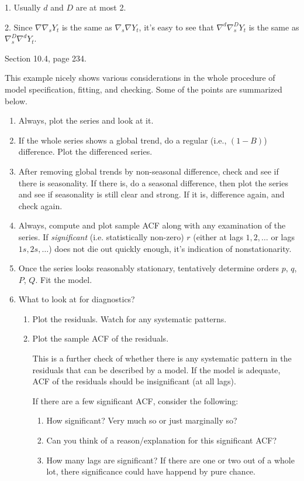 \documentclass[12pt]{article}
\begin{document}
\alert
1. Usually $d$ and $D$ are at most 2.

2.
Since
$\nabla \nabla_s Y_t$ is the same as
$\nabla_s \nabla Y_t$,
it's easy to see that
$\nabla^d \nabla^D_s Y_t$ is the same as
$\nabla^D_s \nabla^d Y_t$.

\example Section 10.4, page 234.

This example nicely shows various considerations
in the whole procedure of model specification, fitting, and checking.
Some of the points are summarized below.
\begin{enumerate}
\item Always, plot the series and look at it.
\item If the whole series shows a global trend, do a
    regular (i.e., $(1 - B)$) difference. Plot the differenced series.
\item After removing global trends by non-seasonal difference,
    check and see if there is seasonality.
    If there is, do a seasonal difference,
    then plot the series and see if seasonality is still clear and
    strong. If it is, difference again, and check again.
\item Always, compute and plot sample ACF along with any examination
    of the series.
    If \emph{significant} (i.e. statistically non-zero)
    $r$ (either at lags $1,2,\dotsc$ or lags $1s,2s,\dotsc$)
    does not die out quickly enough, it's indication of nonstationarity.
\item Once the series looks reasonably stationary,
    tentatively determine orders $p$, $q$, $P$, $Q$.
    Fit the model.
\item What to look at for diagnostics?
\begin{enumerate}
    \item Plot the residuals. Watch for any systematic patterns.
    \item Plot the sample ACF of the residuals.

        This is a further check of whether there is any systematic
        pattern in the residuals that can be described by a model.
        If the model is adequate, ACF of the residuals should be
        insignificant (at all lags).

        If there are a few significant ACF, consider the following:
        \begin{enumerate}
        \item How significant? Very much so or just marginally so?
        \item Can you think of a reason/explanation for this significant
        ACF?
        \item How many lags are significant? If there are one or two
        out of a whole lot, there significance could have happend
        by pure chance.
        \end{enumerate}


\end{enumerate}
\end{enumerate}
\end{document}
